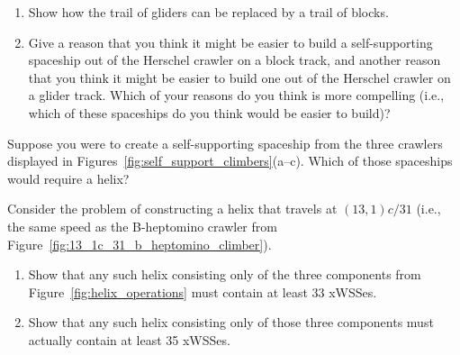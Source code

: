\begin{multicols}{2}
\begin{problemstar}
	\begin{enumerate}[label=\bf\color{ocre}(\alph*)]
		\item Show how the trail of gliders can be replaced by a trail of blocks.
		
		\item Give a reason that you think it might be easier to build a self-supporting spaceship out of the Herschel crawler on a block track, and another reason that you think it might be easier to build one out of the Herschel crawler on a glider track. Which of your reasons do you think is more compelling (i.e., which of these spaceships do you think would be easier to build)?
	\end{enumerate}
\end{problemstar}


\mfilbreak


\begin{problemstar}\label{exer:make_self_support_need_helix}
	Suppose you were to create a self-supporting spaceship from the three crawlers displayed in Figures~\ref{fig:self_support_climbers}(a--c). Which of those spaceships would require a helix?
\end{problemstar}


\mfilbreak


\begin{problem}\label{exer:13_1c_31_helix_large}
	Consider the problem of constructing a helix that travels at $(13,1)c/31$ (i.e., the same speed as the B-heptomino crawler from Figure~\ref{fig:13_1c_31_b_heptomino_climber}).\smallskip
	
	\begin{enumerate}[label=\bf\color{ocre}(\alph*)]
		\item Show that any such helix consisting only of the three components from Figure~\ref{fig:helix_operations} must contain at least 33 xWSSes.
		
		
		
		\item Show that any such helix consisting only of those three components must actually contain at least 35 xWSSes.
		

\end{enumerate}
\end{problem}
\end{multicols}
